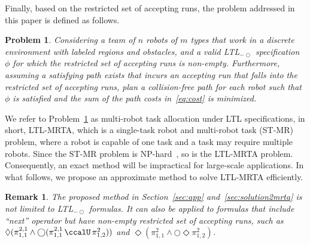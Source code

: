 \documentclass[Afour,sageh,times]{sagej}
\newtheorem{problem}{Problem}
\newtheorem{rem}[thm]{Remark}
\newcommand{\ltl}{ {\it LTL}$_{-\bigcirc}$ }
\renewcommand{\ap}[3]{\mathcal{\pi}_{{#1},{#2}}^{#3}}
\begin{document}
Finally, based on  the restricted set of accepting runs, the problem addressed in this paper is defined as follows.

\begin{problem}\label{prob:1}
Considering a team of $n$ robots of $m$ types that work in a discrete environment with labeled regions and obstacles, and a valid \ltl specification $\phi$ for which the restricted set of accepting runs is non-empty. Furthermore, assuming a satisfying path exists that incurs an accepting run that falls into the restricted set of accepting runs, plan a collision-free path for each robot such that $\phi$ is satisfied and the sum of the path costs in~\eqref{eq:cost} is minimized.
\end{problem}

We refer to Problem~\ref{prob:1} as multi-robot task allocation under LTL specifications, in short, LTL-MRTA, which is a single-task robot and multi-robot task (ST-MR) problem, where a robot is capable of one task and a task may require multiple robots. Since the ST-MR problem is NP-hard~\cite{korsah2013comprehensive,nunes2017taxonomy}, so is the LTL-MRTA problem. Consequently, an exact method will be impractical for large-scale applications. In what follows, we propose an approximate method to solve LTL-MRTA efficiently.

\begin{rem}
The proposed method in Section~\ref{sec:app} and~\ref{sec:solution2mrta} is not limited to  LTL$_{-\bigcirc}$ formulas. It can also be applied to  formulas that include ``next'' operator but have non-empty restricted set of accepting runs, such as $\Diamond(\ap{1}{1}{2,1} \wedge \bigcirc (\ap{1}{1}{2,1} \,\ccalU\, \ap{1}{2}{2}))$ and $\Diamond (\ap{1}{1}{2}  \wedge \bigcirc \Diamond \ap{1}{2}{2})$.
\end{rem}
\end{document}
